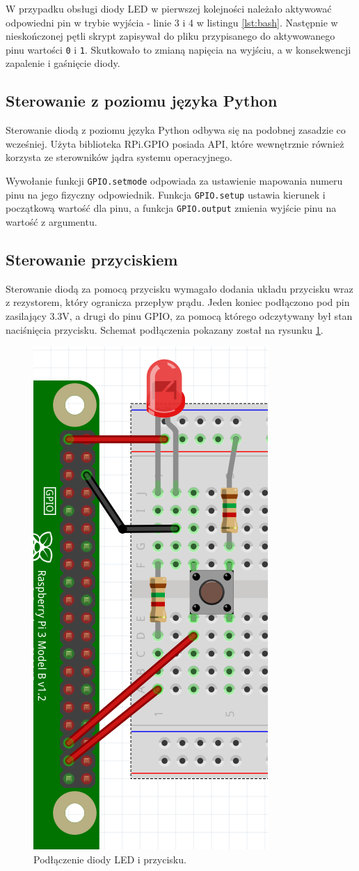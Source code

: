 \documentclass[12pt]{article}
\begin{document}
W przypadku obsługi diody LED w pierwszej kolejności należało aktywować odpowiedni pin w trybie wyjścia - linie 3 i 4 w listingu \ref{lst:bash}. Następnie w nieskończonej pętli skrypt zapisywał do pliku przypisanego do aktywowanego pinu wartości \lstinline{0} i \lstinline{1}. Skutkowało to zmianą napięcia na wyjściu, a w konsekwencji zapalenie i gaśnięcie diody.


\subsection{Sterowanie z poziomu języka Python}
Sterowanie diodą z poziomu języka Python odbywa się na podobnej zasadzie co wcześniej. Użyta biblioteka RPi.GPIO posiada API, które wewnętrznie również korzysta ze sterowników jądra systemu operacyjnego. 


Wywołanie funkcji \lstinline{GPIO.setmode} odpowiada za ustawienie mapowania numeru pinu na jego fizyczny odpowiednik. Funkcja \lstinline{GPIO.setup} ustawia kierunek i początkową wartość dla pinu, a funkcja \lstinline{GPIO.output} zmienia wyjście pinu na wartość z argumentu.
\newpage
\subsection{Sterowanie przyciskiem}

Sterowanie diodą za pomocą przycisku wymagało dodania układu przycisku wraz z rezystorem, który ogranicza przepływ prądu. Jeden koniec podłączono pod pin zasilający 3.3V, a drugi do pinu GPIO, za pomocą którego odczytywany był stan naciśnięcia przycisku. Schemat podłączenia pokazany został na rysunku \ref{sch:2}.

\begin{figure}[h]
  \centering
  \includegraphics[height=0.4\linewidth]{sch2}
  \caption{Podłączenie diody LED i przycisku.}
  \label{sch:2}
\end{figure}
\end{document}
